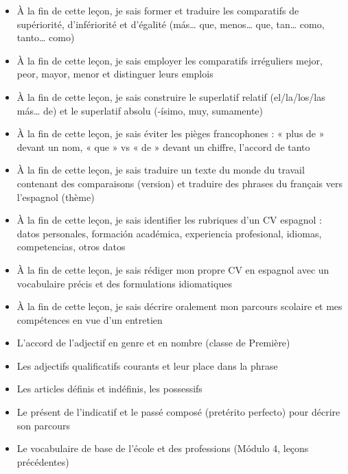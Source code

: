 \documentclass[11pt]{article}
\begin{document}
\begin{objectifs}
\begin{itemize}
\item À la fin de cette leçon, je sais former et traduire les comparatifs de supériorité, d'infériorité et d'égalité (más… que, menos… que, tan… como, tanto… como)
\item À la fin de cette leçon, je sais employer les comparatifs irréguliers mejor, peor, mayor, menor et distinguer leurs emplois
\item À la fin de cette leçon, je sais construire le superlatif relatif (el/la/los/las más… de) et le superlatif absolu (-ísimo, muy, sumamente)
\item À la fin de cette leçon, je sais éviter les pièges francophones : « plus de » devant un nom, « que » vs « de » devant un chiffre, l'accord de tanto
\item À la fin de cette leçon, je sais traduire un texte du monde du travail contenant des comparaisons (version) et traduire des phrases du français vers l'espagnol (thème)
\item À la fin de cette leçon, je sais identifier les rubriques d'un CV espagnol : datos personales, formación académica, experiencia profesional, idiomas, competencias, otros datos
\item À la fin de cette leçon, je sais rédiger mon propre CV en espagnol avec un vocabulaire précis et des formulations idiomatiques
\item À la fin de cette leçon, je sais décrire oralement mon parcours scolaire et mes compétences en vue d'un entretien
\end{itemize}
\end{objectifs}

\begin{prerequis}
\begin{itemize}
\item L'accord de l'adjectif en genre et en nombre (classe de Première)
\item Les adjectifs qualificatifs courants et leur place dans la phrase
\item Les articles définis et indéfinis, les possessifs
\item Le présent de l'indicatif et le passé composé (pretérito perfecto) pour décrire son parcours
\item Le vocabulaire de base de l'école et des professions (Módulo 4, leçons précédentes)
\end{itemize}
\end{prerequis}
\end{document}
